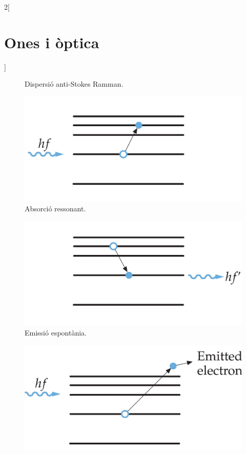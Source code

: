 \documentclass[class=article,10pt,crop=false]{standalone}
\begin{document}
\begin{multicols}{2}[\section{Ones i òptica}]
\begin{figure}[ht]
    \caption{Dispersió an\-ti-Stokes Ramman.}
\end{figure}
\begin{figure}[ht]
    \includegraphics[width=\linewidth]{Physics/1st/Ones_i_optica/Imatges/Ressonance.jpg} 
    \caption{Absorció res\-so\-nant.}   
\end{figure}
\begin{figure}[ht]
    \includegraphics[width=\linewidth]{Physics/1st/Ones_i_optica/Imatges/spontaneous.jpg}
    \caption{Emissió es\-pon\-tà\-ni\-a.}
\end{figure}
\begin{figure}[ht]
    \includegraphics[width=\linewidth]{Physics/1st/Ones_i_optica/Imatges/photoelectric.jpg} 

\end{figure}
\end{multicols}
\end{document}
